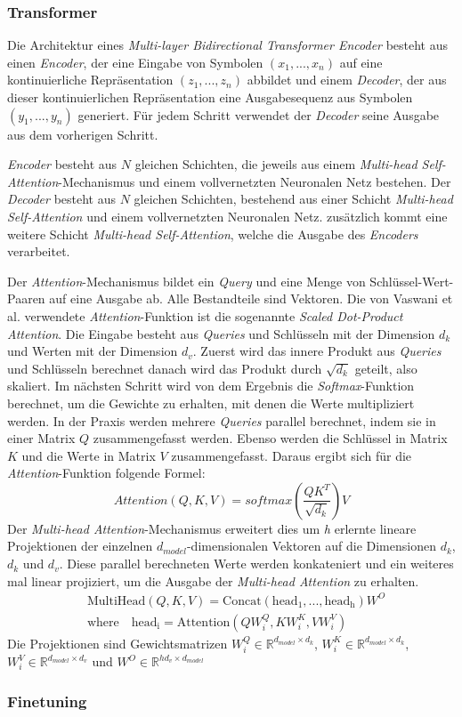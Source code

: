 \subsubsection{Transformer}
Die Architektur eines \textit{Multi-layer Bidirectional Transformer Encoder} besteht aus einen \textit{Encoder}, der eine Eingabe von Symbolen $(x_1,...,x_n)$ auf eine kontinuierliche Repräsentation $(z_1,...,z_n)$ abbildet 
und einem \textit{Decoder}, der aus dieser kontinuierlichen Repräsentation eine Ausgabesequenz aus Symbolen $(y_1,...,y_n)$ generiert. Für jedem Schritt verwendet der 
\textit{Decoder} seine Ausgabe aus dem vorherigen Schritt. \par
\textit{Encoder} besteht aus $N$ gleichen Schichten, die jeweils aus einem \textit{Multi-head Self-Attention}-Mechanismus und einem vollvernetzten Neuronalen Netz bestehen.
Der \textit{Decoder} besteht aus $N$ gleichen Schichten, bestehend aus einer Schicht \textit{Multi-head Self-Attention} und einem vollvernetzten Neuronalen Netz. zusätzlich kommt eine weitere Schicht \textit{Multi-head Self-Attention},
welche die Ausgabe des \textit{Encoders} verarbeitet. \par
Der \textit{Attention}-Mechanismus \cite{vaswani2017attention} bildet ein \textit{Query} und eine Menge von Schlüssel-Wert-Paaren auf eine Ausgabe ab. Alle Bestandteile sind Vektoren.
Die von Vaswani et al. verwendete \textit{Attention}-Funktion ist die sogenannte \textit{Scaled Dot-Product Attention}. Die Eingabe besteht aus \textit{Queries} und Schlüsseln mit der Dimension $d_k$ und Werten mit der Dimension $d_v$.
Zuerst wird das innere Produkt aus \textit{Queries} und Schlüsseln berechnet danach wird das Produkt durch $\sqrt{d_k}$ geteilt, also skaliert. Im nächsten Schritt wird von dem Ergebnis die \textit{Softmax}-Funktion berechnet, um die Gewichte zu erhalten, mit denen die Werte multipliziert werden. 
In der Praxis werden mehrere \textit{Queries} parallel berechnet, indem sie in einer Matrix $Q$ zusammengefasst werden. Ebenso werden die Schlüssel in Matrix $K$ und die Werte in Matrix $V$ zusammengefasst.
Daraus ergibt sich für die \textit{Attention}-Funktion folgende Formel:
\begin{equation*}
Attention(Q,K,V) = softmax(\frac{QK^T}{\sqrt{d_k}})V    
\end{equation*}
Der \textit{Multi-head Attention}-Mechanismus erweitert dies um \textit{h} erlernte lineare Projektionen der einzelnen $d_{model}$-dimensionalen Vektoren auf die Dimensionen $d_k$, $d_k$ und $d_v$. 
Diese parallel berechneten Werte werden konkateniert und ein weiteres mal linear projiziert, um die Ausgabe der \textit{Multi-head Attention} zu erhalten.
\begin{align*}
   & \mathrm{MultiHead}(Q,K,V) = \mathrm{Concat}(\mathrm{head_1},...,\mathrm{head_h})W^O \\
   & \mathrm{where} \quad \mathrm{head_i} = \mathrm{Attention}(QW_i^Q,KW_i^K,VW_i^V)
\end{align*}
Die Projektionen sind Gewichtsmatrizen $W_i^Q \in \mathbb{R}^{d_{model}\times d_k}$, $W_i^K \in \mathbb{R}^{d_{model}\times d_k}$, $W_i^V \in \mathbb{R}^{d_{model}\times d_v}$ und $W^O \in \mathbb{R}^{hd_v\times d_{model}}$
\subsubsection{Finetuning}